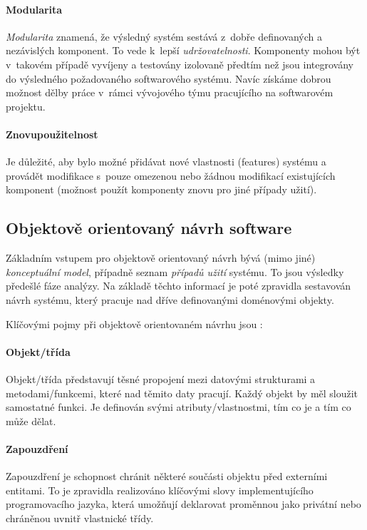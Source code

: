 \paragraph{Modularita} \emph{Modularita} znamená, že výsledný systém sestává z~dobře definovaných a nezávislých komponent. To vede k~lepší \emph{udržovatelnosti}. Komponenty mohou být v~takovém případě vyvíjeny a testovány izolovaně předtím než jsou integrovány do výsledného požadovaného softwarového systému. Navíc získáme dobrou možnost dělby práce v~rámci vývojového týmu pracujícího na softwarovém projektu.

\paragraph{Znovupoužitelnost} Je důležité, aby bylo možné přidávat nové vlastnosti (features) systému a provádět modifikace s~pouze omezenou nebo žádnou modifikací existujících komponent (možnost použít komponenty znovu pro jiné případy užití).

\subsection{Objektově orientovaný návrh software}
Základním vstupem pro objektově orientovaný návrh bývá (mimo jiné) \emph{konceptuální model}, případně seznam \emph{případů užití} systému. To jsou výsledky předešlé fáze analýzy. Na základě těchto informací je poté zpravidla sestavován návrh systému, který pracuje nad dříve definovanými doménovými objekty.

Klíčovými pojmy při objektově orientovaném návrhu jsou \cite{wiki:oop_design}:

\paragraph{Objekt/třída}  Objekt/třída představují těsné propojení mezi datovými strukturami a metodami/funkcemi, které nad těmito daty pracují. Každý objekt by měl sloužit samostatné funkci. Je definován svými atributy/vlastnostmi, tím co je a tím co může dělat.
\paragraph{Zapouzdření} Zapouzdření je schopnost chránit některé součásti objektu před externími entitami. To je zpravidla realizováno klíčovými slovy implementujícího programovacího jazyka, která umožňují deklarovat proměnnou jako privátní nebo chráněnou uvnitř vlastnické třídy.
